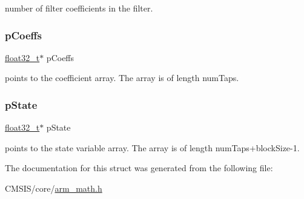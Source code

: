 number of filter coefficients in the filter. \mbox{\label{structarm__fir__instance__f32_aacbb8dd8eeba4b21fc2bb40076405ee3}} 
\subsubsection{\texorpdfstring{pCoeffs}{pCoeffs}}
{\footnotesize\ttfamily \mbox{\hyperlink{arm__math_8h_a4611b605e45ab401f02cab15c5e38715}{float32\+\_\+t}}$\ast$ p\+Coeffs}

points to the coefficient array. The array is of length num\+Taps. \mbox{\label{structarm__fir__instance__f32_a335c87e6fdc4b96601d95a5de8b9c463}} 
\subsubsection{\texorpdfstring{pState}{pState}}
{\footnotesize\ttfamily \mbox{\hyperlink{arm__math_8h_a4611b605e45ab401f02cab15c5e38715}{float32\+\_\+t}}$\ast$ p\+State}

points to the state variable array. The array is of length num\+Taps+block\+Size-\/1. 

The documentation for this struct was generated from the following file\+:\begin{DoxyCompactItemize}
\item 
C\+M\+S\+I\+S/core/\mbox{\hyperlink{arm__math_8h}{arm\+\_\+math.\+h}}\end{DoxyCompactItemize}
